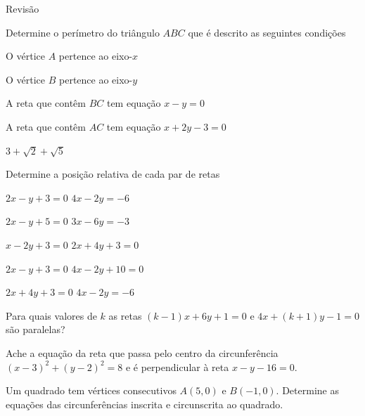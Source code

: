 \begin{exercicios}{Revisão}
    \begin{exercicio}
        Determine o perímetro do triângulo $ABC$ que é descrito as seguintes condições
        \begin{alphalist}
            \item O vértice $A$ pertence ao eixo-$x$
            \item O vértice $B$ pertence ao eixo-$y$
            \item A reta que contêm $BC$ tem equação $x-y=0$
            \item A reta que contêm $AC$ tem equação $x+2y-3=0$
        \end{alphalist}
        \begin{answers}
            \tabto{2em} $3+\sqrt{2}+\sqrt{5}$
        \end{answers}
    \end{exercicio}
        
    \begin{exercicio}
        Determine a posição relativa de cada par de retas
        \begin{alphalist}
            \item $2x- y+3=0$  \tabto{3cm}  $4x-2y=-6$
            \item $2x- y+5=0$  \tabto{3cm}  $3x-6y=-3$
            \item $ x-2y+3=0$  \tabto{3cm}  $2x+4y+ 3=0$
            \item $2x- y+3=0$  \tabto{3cm}  $4x-2y+10=0$
            \item $2x+4y+3=0$  \tabto{3cm}  $4x-2y=-6$
        \end{alphalist}
    \end{exercicio}
        
    \begin{exercicio}
        Para quais valores de $k$ as retas $(k-1)x+6y+1=0$ e $4x+(k+1)y-1=0$ são paralelas?
    \end{exercicio}
    
    \begin{exercicio}
        Ache a equação da reta que passa pelo centro da circunferência $(x-3)^2+(y-2)^2=8$ e é perpendicular à reta $x-y-16=0$.
    \end{exercicio}
    
    \begin{exercicio}
        Um quadrado tem vértices consecutivos $A(5,0)$ e $B(-1,0)$. Determine as equações das circunferências inscrita e circunscrita ao quadrado.
    \end{exercicio}
    

\end{exercicios}

